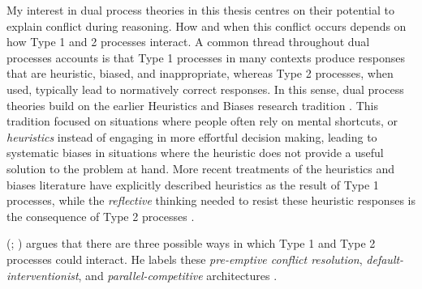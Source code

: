 My interest in dual process theories in this thesis
centres on their potential to explain conflict during reasoning.
How and when this conflict occurs depends
on how Type 1 and 2 processes interact.
A common thread throughout dual processes accounts
is that Type 1 processes in many contexts
produce responses that are heuristic, biased, and inappropriate,
whereas Type 2 processes, when used,
typically lead to normatively correct responses.
In this sense, dual process theories build on
the earlier Heuristics and Biases research tradition
\citep{Gilovich2002,Tversky1974,Kahneman1982}.
This tradition focused on situations where
people often rely on mental shortcuts, or \emph{heuristics}
instead of engaging in more effortful decision making,
leading to systematic biases in situations where
the heuristic does not provide a useful solution
to the problem at hand.
More recent treatments of the heuristics and biases literature
\citep{Kahneman2005,Kahneman2002,Kahneman2011}
have explicitly described heuristics as the result of Type 1 processes,
while the \emph{reflective} thinking
needed to resist these heuristic responses \citep{Frederick2005}
is the consequence of Type 2 processes
\citep[although, again, see][for contrasting views]{Gigerenzer2011,Kruglanski2011}.

\citeauthor{Evans2007a} (\citeyear{Evans2007a}; \citealp[see also][]{Gilbert1999})
argues that there are three possible ways in which
Type 1 and Type 2 processes could interact.
He labels these
\emph{pre-emptive conflict resolution},
\emph{default-interventionist},
and \emph{parallel-competitive} architectures
\citep[perhaps more intuitively referred to as
  \emph{selective}, \emph{corrective}, and \emph{competitive} designs by][]{Gilbert1999}.

